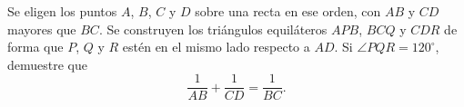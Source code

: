 Se eligen los puntos $A$, $B$, $C$ y $D$ sobre una recta en ese orden, con $AB$ y $CD$ mayores que $BC$. Se construyen los triángulos equiláteros $APB$, $BCQ$ y $CDR$ de forma que $P$, $Q$ y $R$ estén en el mismo lado respecto a $AD$. Si $\angle PQR=120^\circ$, demuestre que
\[ \frac{1}{AB}+\frac{1}{CD}=\frac{1}{BC}. \]
